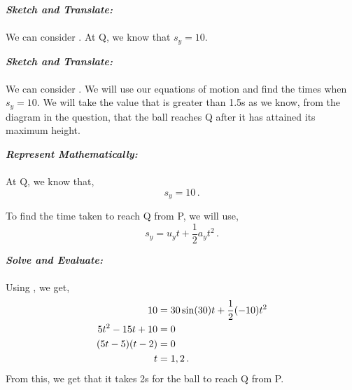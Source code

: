 \begin{subquestions}
\subquestion 

\textbf{\textit{Sketch and Translate:}} \\ \\
We can consider . At Q, we know that $s_y=10$.




\textbf{\textit{Sketch and Translate:}} \\ \\
We can consider . We will use our equations of motion and find the times when $s_y=10$. We will take the value that is greater than 1.5s as we know, from the diagram in the question, that the ball reaches Q after it has attained its maximum height.




\textbf{\textit{Represent Mathematically:}} \\ \\
At Q, we know that,
\begin{equation}
	s_y=10 \,.
\end{equation}

To find the time taken to reach Q from P, we will use,
\begin{equation}
	s_y = u_yt + \frac{1}{2}a_yt^2 \label{2005:q6:SEqn2} \,.
\end{equation}




\textbf{\textit{Solve and Evaluate:}} \\ \\
Using , we get,
\begin{align}
	10 & = 30\sin(30)t + \frac{1}{2}(-10)t^2 \nonumber \\
	5t^2-15t+10 & = 0 \nonumber \\
	(5t-5)(t-2) & = 0 \nonumber \\
	t & = 1, 2 \,.
\end{align}
From this, we get that it takes 2s for the ball to reach Q from P.


\subquestion 


\end{subquestions}
